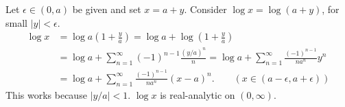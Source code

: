 \documentclass[12pt]{report}
\newcommand{\abs}[1]{\left| #1 \right|}
\begin{document}
\begin{enumerate}
    Let \(\epsilon \in (0, a)\) be given and set \(x = a + y\). Consider \(\log x = \log (a + y)\), for small \(\abs{y} < \epsilon\).
    \[
        \begin{aligned}
            \log x & = \log a \left(1 + \frac{y}{a}\right) = \log a + \log\left(1 + \frac{y}{a}\right)                                 \\
                   & = \log a + \sum_{n=1}^\infty (-1)^{n-1} \frac{(y/a)^n}{n} = \log a + \sum_{n=1}^\infty \frac{(-1)^{n-1}}{na^n}y^n \\
                   & = \log a + \sum_{n=1}^\infty \frac{(-1)^{n-1}}{na^n} (x - a)^n. \qquad (x \in (a - \epsilon, a + \epsilon))
        \end{aligned}
    \]
    This works because \(\abs{y/a} < 1\). \(\log x\) is real-analytic on \((0, \infty)\).


\end{enumerate}
\end{document}
